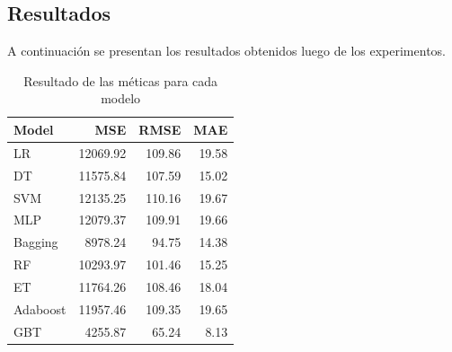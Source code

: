 \documentclass[spanish]{article}
\begin{document}
        
      \subsection{Resultados}
      

        A continuación se presentan los resultados obtenidos luego de los experimentos.

        \clearpage

        \begin{table}[!ht]
          \centering
          \caption{Resultado de las méticas para cada modelo}
          \label{tab:results}
          \begin{tabular}{l|rrr}
            \hline
            Model    & MSE   & RMSE & MAE \\ \hline \hline
            LR       & 12069.92 & 109.86 & 19.58 \\
            DT       & 11575.84 & 107.59 & 15.02 \\
            SVM      & 12135.25 & 110.16 & 19.67 \\
            MLP      & 12079.37 & 109.91 & 19.66 \\
            Bagging  & 8978.24  & 94.75  & 14.38 \\
            RF       & 10293.97 & 101.46 & 15.25 \\ 
            ET       & 11764.26 & 108.46 & 18.04 \\
            Adaboost & 11957.46 & 109.35 & 19.65 \\
            GBT      & 4255.87  & 65.24  & 8.13  \\ \hline
          \end{tabular}
        \end{table}        
\end{document}
